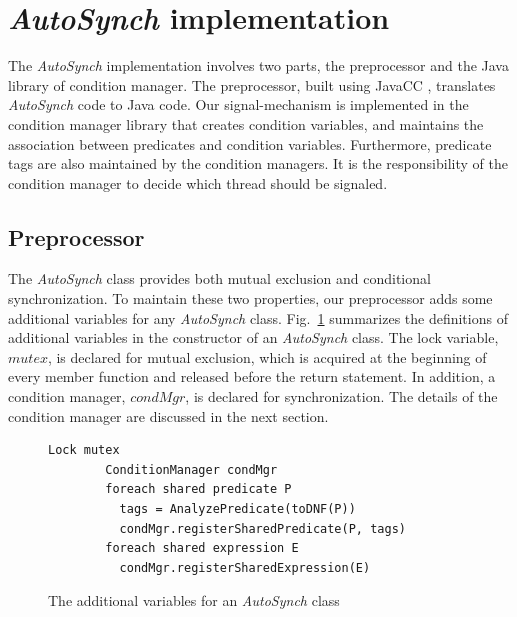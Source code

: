 \documentclass[preprint]{sigplanconf}
\begin{document}
\section{{\em AutoSynch} implementation} \label{sec:imp}
The {\em AutoSynch} implementation involves two parts, the preprocessor and the Java
library of condition manager. The preprocessor,  built using JavaCC
\cite{kod04}, translates  {\em AutoSynch} code to Java code. Our
signal-mechanism is implemented in 
the condition manager library that creates condition variables, and maintains the association 
between predicates and condition variables. Furthermore, predicate tags are 
also maintained by the condition managers. It is the responsibility of the
condition manager to decide which thread should be signaled. 

\subsection{Preprocessor}
The {\em AutoSynch} class provides both mutual exclusion and conditional
synchronization. To maintain these two properties, our preprocessor adds some 
additional variables for any {\em AutoSynch} class. Fig.~\ref{fig:pre_cnst} 
summarizes the definitions of additional variables in the
constructor of an {\em AutoSynch} class. The lock 
variable, $mutex$, is declared for mutual exclusion, which is acquired at the 
beginning of every member function and released before the return statement.
In addition, a condition manager, $condMgr$, is declared for synchronization. 
The details of the condition manager are discussed in the next
section.  


\begin{figure}[ht!]
    \begin{Verbatim}[fontsize=\footnotesize,gobble=8,frame=lines,
            framesep=3mm]
        Lock mutex
        ConditionManager condMgr 
        foreach shared predicate P
          tags = AnalyzePredicate(toDNF(P))
          condMgr.registerSharedPredicate(P, tags)
        foreach shared expression E
          condMgr.registerSharedExpression(E)
    \end{Verbatim}
  \caption{The additional variables for an {\em AutoSynch} class}
  \label{fig:pre_cnst}
\end{figure}  
\end{document}

